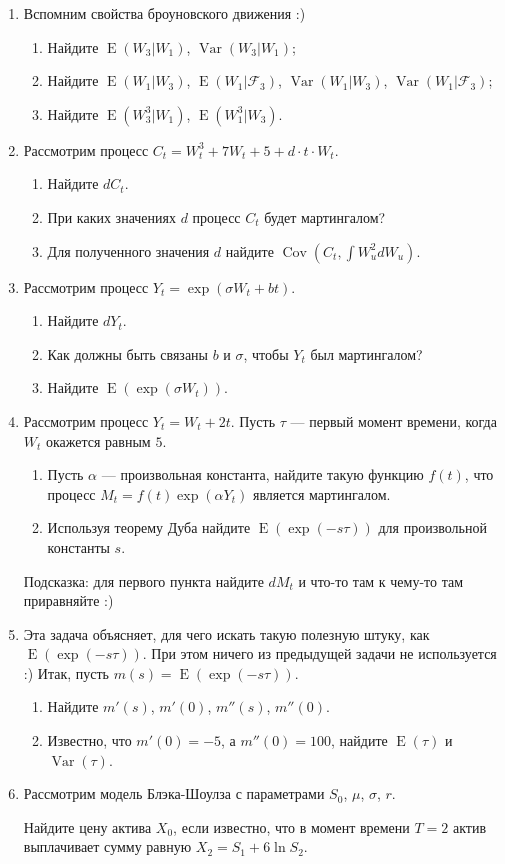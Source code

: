 \documentclass[13pt]{article}
\DeclareMathOperator{\Cov}{Cov}
\DeclareMathOperator{\Var}{Var}
\DeclareMathOperator{\E}{E}
\begin{document}
\begin{enumerate}

  \item Вспомним свойства броуновского движения :)
  \begin{enumerate}
    \item Найдите $\E(W_3 | W_1)$, $\Var(W_3 | W_1)$;
    \item Найдите $\E(W_1 | W_3)$, $\E(W_1 | \mathcal{F}_3)$, $\Var(W_1 | W_3)$, $\Var(W_1 | \mathcal{F}_3)$;
    \item Найдите $\E(W_3^3 | W_1)$, $\E(W_1^3 | W_3)$.
  \end{enumerate}
  

  \item Рассмотрим процесс $C_t = W_t^3 + 7 W_t + 5 + d\cdot t\cdot W_t$.
  \begin{enumerate}
    \item Найдите $dC_t$.
    \item При каких значениях $d$ процесс $C_t$ будет мартингалом?
    \item Для полученного значения $d$ найдите $\Cov(C_t, \int W^2_u dW_u)$.
  \end{enumerate}

  \item Рассмотрим процесс $Y_t = \exp(\sigma W_t + bt)$. 
  \begin{enumerate}
    \item Найдите $dY_t$.
    \item Как должны быть связаны $b$ и $\sigma$, чтобы $Y_t$ был мартингалом?
    \item Найдите $\E(\exp(\sigma W_t))$.
  \end{enumerate}
  

  \item Рассмотрим процесс $Y_t = W_t + 2t$. Пусть $\tau$ — первый момент времени, когда $W_t$ окажется равным $5$. 
\begin{enumerate}
  \item Пусть $\alpha$ — произвольная константа, найдите такую функцию $f(t)$, 
  что процесс $M_t = f(t)\exp(\alpha Y_t)$ является мартингалом. 
  \item Используя теорему Дуба найдите $\E(\exp(-s \tau))$ для произвольной константы $s$. 
\end{enumerate}

Подсказка: для первого пункта найдите $dM_t$ и что-то там к чему-то там приравняйте :)

\item Эта задача объясняет, для чего искать такую полезную штуку, как $\E(\exp(-s \tau))$.
При этом ничего из предыдущей задачи не используется :) Итак, пусть $m(s) = \E(\exp(-s \tau))$.
\begin{enumerate}
  \item Найдите $m'(s)$, $m'(0)$, $m''(s)$, $m''(0)$.
  \item Известно, что $m'(0)= -5$, а $m''(0)=100$, найдите $\E(\tau)$ и $\Var(\tau)$.
\end{enumerate}


\item Рассмотрим модель Блэка-Шоулза с параметрами $S_0$, $\mu$, $\sigma$, $r$.
  
Найдите цену актива $X_0$, если известно, что в момент времени $T=2$ актив выплачивает 
сумму равную $X_2 = S_1 + 6 \ln S_2$.


\end{enumerate}
\end{document}
